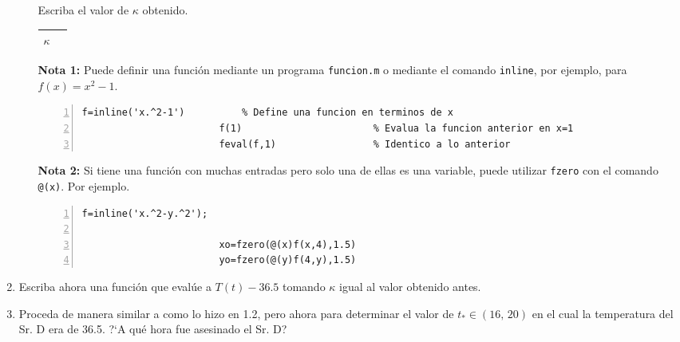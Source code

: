 \documentclass[letter,11pt]{article}
\newcommand\0{\mathbf{0}}
\begin{document}
\begin{enumerate}
\begin{enumerate}
						\medskip

						Escriba el valor de $\kappa$ obtenido.

						\medskip

						\def\arraystretch{1.5}
						\begin{center}
							\begin{tabular}{|p{.8in}|p{4in}|}
								\hline $\kappa$ & \\
								\hline
						\end{tabular}\end{center}
						\medskip

\textbf{Nota 1:} Puede definir una funci\'on mediante un programa \verb"funcion.m" o mediante el comando \verb"inline", por ejemplo, para $f(x)=x^2-1$.

						\medskip
							
						\begin{Verbatim}[gobble=6,frame=single,numbers=left]
						f=inline('x.^2-1')          % Define una funcion en terminos de x 
						f(1)                       % Evalua la funcion anterior en x=1
						feval(f,1)                 % Identico a lo anterior
						\end{Verbatim}
						
						\medskip


\textbf{Nota 2:} Si tiene una funci\'on con muchas entradas pero solo una de ellas es una variable, puede utilizar \verb"fzero" con el comando \verb"@(x)". Por ejemplo.

						\medskip
							
						\begin{Verbatim}[gobble=6,frame=single,numbers=left]
						f=inline('x.^2-y.^2');

						xo=fzero(@(x)f(x,4),1.5)
						yo=fzero(@(y)f(4,y),1.5)
						\end{Verbatim}
						
						\medskip



				\end{enumerate}

			\item Escriba ahora una funci\'on que eval\'ue a $T(t)-36.5$ tomando $\kappa$ igual
				al valor obtenido antes.


			\item Proceda de manera similar a como lo hizo en 1.2, pero ahora para determinar
				el valor de $t_* \in (16,\,20)$ en el cual la temperatura del Sr. D era de
				36.5. ?`A qu\'e hora fue asesinado el Sr. D?
				

\end{enumerate}
\end{document}
